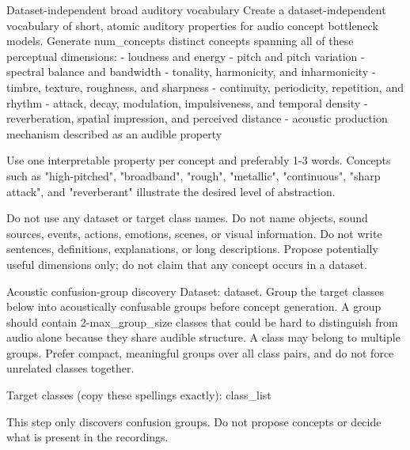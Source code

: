 \documentclass[10pt]{article}
\begin{document}
\begin{prompt}{Dataset-independent broad auditory vocabulary}
Create a dataset-independent vocabulary of short, atomic auditory properties for audio concept bottleneck models. Generate {num_concepts} distinct concepts spanning all of these perceptual dimensions:
- loudness and energy
- pitch and pitch variation
- spectral balance and bandwidth
- tonality, harmonicity, and inharmonicity
- timbre, texture, roughness, and sharpness
- continuity, periodicity, repetition, and rhythm
- attack, decay, modulation, impulsiveness, and temporal density
- reverberation, spatial impression, and perceived distance
- acoustic production mechanism described as an audible property

Use one interpretable property per concept and preferably 1-3 words. Concepts such as "high-pitched", "broadband", "rough", "metallic", "continuous", "sharp attack", and "reverberant" illustrate the desired level of abstraction.

Do not use any dataset or target class names. Do not name objects, sound sources, events, actions, emotions, scenes, or visual information. Do not write sentences, definitions, explanations, or long descriptions. Propose potentially useful dimensions only; do not claim that any concept occurs in a dataset.
\end{prompt}

\begin{prompt}{Acoustic confusion-group discovery}
Dataset: {dataset}.
Group the target classes below into acoustically confusable groups before concept generation. A group should contain 2-{max_group_size} classes that could be hard to distinguish from audio alone because they share audible structure. A class may belong to multiple groups. Prefer compact, meaningful groups over all class pairs, and do not force unrelated classes together.

Target classes (copy these spellings exactly):
{class_list}

This step only discovers confusion groups. Do not propose concepts or decide what is present in the recordings.
\end{prompt}
\end{document}
